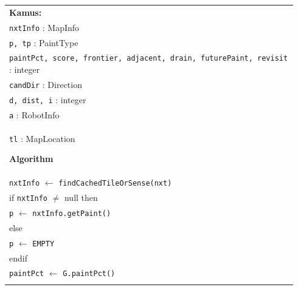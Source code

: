 \documentclass{article}
\newenvironment{pseudobox}
{
\centering
\begin{longtable}{|p{0.94\linewidth}|}
\hline
}
{
\\ \hline
\end{longtable}
\vspace{0.05cm}
}
\begin{document}
\begin{enumerate}[label=\alph*.]
\begin{enumerate}[label=\alph*.]
\begin{pseudobox}
\textbf{Kamus:} \\
\hspace*{1.5em}\texttt{nxtInfo} : MapInfo \\
\hspace*{1.5em}\texttt{p, tp} : PaintType \\
\hspace*{1.5em}\texttt{paintPct, score, frontier, adjacent, drain, futurePaint, revisit} : integer \\
\hspace*{1.5em}\texttt{candDir} : Direction \\
\hspace*{1.5em}\texttt{d, dist, i} : integer \\
\hspace*{1.5em}\texttt{a} : RobotInfo \\
\hspace*{1.5em}\texttt{tl} : MapLocation

\textbf{Algorithm} \\
\hspace*{1.5em}\texttt{nxtInfo} $\leftarrow$ \texttt{findCachedTileOrSense(nxt)} \\
\hspace*{1.5em}if \texttt{nxtInfo} $\neq$ null then \\
\hspace*{3em}\texttt{p} $\leftarrow$ \texttt{nxtInfo.getPaint()} \\
\hspace*{1.5em}else \\
\hspace*{3em}\texttt{p} $\leftarrow$ \texttt{EMPTY} \\
\hspace*{1.5em}endif \\

\hspace*{1.5em}\texttt{paintPct} $\leftarrow$ \texttt{G.paintPct()} \\


\end{pseudobox}
\end{enumerate}
\end{enumerate}
\end{document}
